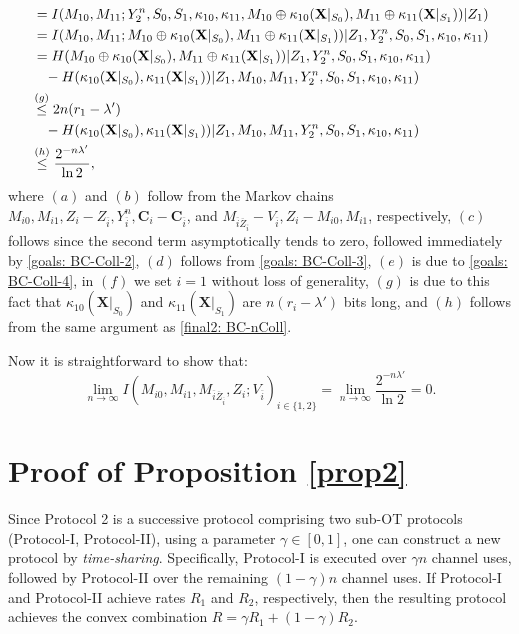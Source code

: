 \documentclass[runningheads]{llncs}
\newcommand{\parbreak}{ \vspace{0.3 em}}
\newcounter{protocol}
\begin{document}
\begin{itemize}
\begin{align}
        & \,=  I  (M_{10},M_{11};Y^n_{2},S_0,S_1, \kappa_{10}, \kappa_{11}, M_{10}\oplus\kappa_{10} (\mathbf{X}|_{S_0}), M_{11}\oplus\kappa_{11}(\mathbf{X}|_{S_1}))|Z_1)\notag\\
        & \,=  I  (M_{10},M_{11}; M_{10}\oplus\kappa_{10} (\mathbf{X}|_{S_0}), M_{11}\oplus\kappa_{11}(\mathbf{X}|_{S_1}))|Z_1, Y^n_{2},S_0,S_1, \kappa_{10}, \kappa_{11})\notag\\
        & \,=  H  ( M_{10}\oplus\kappa_{10} (\mathbf{X}|_{S_0}), M_{11}\oplus\kappa_{11}(\mathbf{X}|_{S_1}))|Z_1, Y^n_{2},S_0,S_1, \kappa_{10}, \kappa_{11})\notag\\
        & \quad - H  ( \kappa_{10} (\mathbf{X}|_{S_0}), \kappa_{11}(\mathbf{X}|_{S_1}))|Z_1, M_{10}, M_{11}, Y^n_{2},S_0,S_1, \kappa_{10}, \kappa_{11})\notag\\
        & \overset{(g)}{\leq} 2n(r_1-\lambda')\notag\\
        &\quad - H  ( \kappa_{10} (\mathbf{X}|_{S_0}), \kappa_{11}(\mathbf{X}|_{S_1}))|Z_1, M_{10}, M_{11}, Y^n_{2},S_0,S_1, \kappa_{10}, \kappa_{11})\notag\\
        & \overset{(h)}{\leq}  \frac{2^{-n\lambda'}}{\ln 2},
    \end{align}
    where $(a)$ and $(b)$ follow from the Markov chains $M_{i0},M_{i1},Z_i-Z_{\overline{i}},Y_{\overline{i}}^n,\mathbf{C}_i-\mathbf{C}_{\overline{i}}$, and $M_{\overline{i}\overline{Z}_{\overline{i}}}-V_{\overline{i}},Z_i-M_{i0},M_{i1}$, respectively, $(c)$ follows since the second term asymptotically tends to zero, followed immediately by \eqref{goals: BC-Coll-2}, $(d)$ follows from \eqref{goals: BC-Coll-3}, $(e)$ is due to \eqref{goals: BC-Coll-4}, in $(f)$ we set $i=1$ without loss of generality, $(g)$ is due to this fact that $\kappa_{10} (\mathbf{X}|_{S_0})$ and $ \kappa_{11}(\mathbf{X}|_{S_1})$ are $n(r_i-\lambda')$ bits long, and $(h)$ follows from the same argument as \eqref{final2: BC-nColl}.

    \parbreak
    Now it is straightforward to show that:
    \[
    \lim_{n\to\infty}   I (M_{i0},M_{i1},M_{\overline{i}\overline{Z}_{\overline{i}}}, Z_i; V_{\overline{i}})_{i\in\{1,2\}} = \lim_{n\to\infty} \frac{2^{-n\lambda'}}{\ln 2} = 0.
    \]
    \end{itemize}
    
\section{Proof of Proposition \ref{prop2}\label{app: thm: lower: coll}}
Since Protocol 2 is a successive protocol comprising two sub-OT protocols (Protocol-I, Protocol-II), using a parameter $\gamma \in [0,1]$, 
one can construct a new protocol by \emph{time-sharing}. Specifically, Protocol-I is 
executed over $\gamma n$ channel uses, followed by Protocol-II over the remaining 
$(1-\gamma)n$ channel uses. If Protocol-I and Protocol-II achieve rates $R_1$ and $R_2$, 
respectively, then the resulting protocol achieves the convex combination $R = \gamma R_1 + (1-\gamma) R_2$. 
\end{document}
